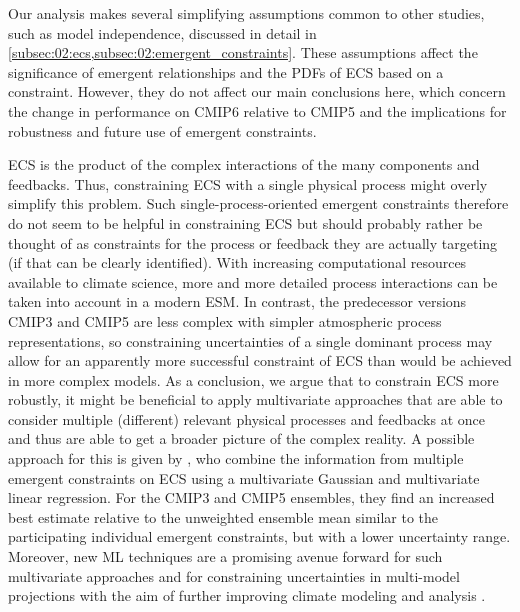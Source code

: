 Our analysis makes several simplifying assumptions common to other studies,
such as model independence, discussed in detail in
\cref{subsec:02:ecs,subsec:02:emergent_constraints}. These assumptions affect
the significance of emergent relationships and the \acp{PDF} of \ac{ECS} based
on a constraint. However, they do not affect our main conclusions here, which
concern the change in performance on \acs{CMIP}6 relative to \acs{CMIP}5 and
the implications for robustness and future use of emergent constraints.

\Ac{ECS} is the product of the complex interactions of the many components and
feedbacks. Thus, constraining \ac{ECS} with a single physical process might
overly simplify this problem. Such single-process-oriented emergent constraints
therefore do not seem to be helpful in constraining \ac{ECS} but should
probably rather be thought of as constraints for the process or feedback they
are actually targeting (if that can be clearly identified). With increasing
computational resources available to climate science, more and more detailed
process interactions can be taken into account in a modern \ac{ESM}. In
contrast, the predecessor versions \acs{CMIP}3 and \acs{CMIP}5 are less complex
with simpler atmospheric process representations, so constraining uncertainties
of a single dominant process may allow for an apparently more successful
constraint of \ac{ECS} than would be achieved in more complex models. As a
conclusion, we argue that to constrain \ac{ECS} more robustly, it might
be beneficial to apply multivariate approaches that are able to consider
multiple (different) relevant physical processes and feedbacks at once and thus
are able to get a broader picture of the complex reality. A possible approach
for this is given by \textcite{Bretherton2020}, who combine the information
from multiple emergent constraints on \ac{ECS} using a multivariate Gaussian
and multivariate linear regression. For the \acs{CMIP}3 and \acs{CMIP}5
ensembles, they find an increased best estimate relative to the unweighted
ensemble mean similar to the participating individual emergent constraints, but
with a lower uncertainty range. Moreover, new \ac{ML} techniques are a
promising avenue forward for such multivariate approaches and for constraining
uncertainties in multi-model projections  with the aim of further improving climate modeling
and analysis \autocite{Reichstein2019}.
